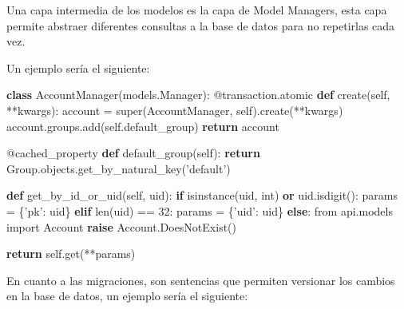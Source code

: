 \documentclass[12pt,a4paperpaper,]{report}
\newenvironment{Shaded}{}{}
\newcommand{\KeywordTok}[1]{\textcolor[rgb]{0.00,0.44,0.13}{\textbf{#1}}}
\newcommand{\DecValTok}[1]{\textcolor[rgb]{0.25,0.63,0.44}{#1}}
\newcommand{\StringTok}[1]{\textcolor[rgb]{0.25,0.44,0.63}{#1}}
\newcommand{\ImportTok}[1]{#1}
\newcommand{\VariableTok}[1]{\textcolor[rgb]{0.10,0.09,0.49}{#1}}
\newcommand{\ControlFlowTok}[1]{\textcolor[rgb]{0.00,0.44,0.13}{\textbf{#1}}}
\newcommand{\OperatorTok}[1]{\textcolor[rgb]{0.40,0.40,0.40}{#1}}
\newcommand{\BuiltInTok}[1]{#1}
\newcommand{\AttributeTok}[1]{\textcolor[rgb]{0.49,0.56,0.16}{#1}}
\newcommand{\NormalTok}[1]{#1}
\begin{document}
Una capa intermedia de los modelos es la capa de Model Managers, esta
capa permite abstraer diferentes consultas a la base de datos para no
repetirlas cada vez.

Un ejemplo sería el siguiente:

\begin{Shaded}
\begin{Highlighting}[]
\KeywordTok{class}\NormalTok{ AccountManager(models.Manager):}
    \AttributeTok{@transaction.atomic}
    \KeywordTok{def}\NormalTok{ create(}\VariableTok{self}\NormalTok{, }\OperatorTok{**}\NormalTok{kwargs):}
\NormalTok{        account }\OperatorTok{=} \BuiltInTok{super}\NormalTok{(AccountManager, }\VariableTok{self}\NormalTok{).create(}\OperatorTok{**}\NormalTok{kwargs)}
\NormalTok{        account.groups.add(}\VariableTok{self}\NormalTok{.default_group)}
        \ControlFlowTok{return}\NormalTok{ account}

    \AttributeTok{@cached_property}
    \KeywordTok{def}\NormalTok{ default_group(}\VariableTok{self}\NormalTok{):}
        \ControlFlowTok{return}\NormalTok{ Group.objects.get_by_natural_key(}\StringTok{'default'}\NormalTok{)}

    \KeywordTok{def}\NormalTok{ get_by_id_or_uid(}\VariableTok{self}\NormalTok{, uid):}
        \ControlFlowTok{if} \BuiltInTok{isinstance}\NormalTok{(uid, }\BuiltInTok{int}\NormalTok{) }\KeywordTok{or}\NormalTok{ uid.isdigit():}
\NormalTok{            params }\OperatorTok{=}\NormalTok{ \{}\StringTok{'pk'}\NormalTok{: uid\}}
        \ControlFlowTok{elif} \BuiltInTok{len}\NormalTok{(uid) }\OperatorTok{==} \DecValTok{32}\NormalTok{:}
\NormalTok{            params }\OperatorTok{=}\NormalTok{ \{}\StringTok{'uid'}\NormalTok{: uid\}}
        \ControlFlowTok{else}\NormalTok{:}
            \ImportTok{from}\NormalTok{ api.models }\ImportTok{import}\NormalTok{ Account}
            \ControlFlowTok{raise}\NormalTok{ Account.DoesNotExist()}

        \ControlFlowTok{return} \VariableTok{self}\NormalTok{.get(}\OperatorTok{**}\NormalTok{params)}
\end{Highlighting}
\end{Shaded}

En cuanto a las migraciones, son sentencias que permiten versionar los
cambios en la base de datos, un ejemplo sería el siguiente:
\end{document}
